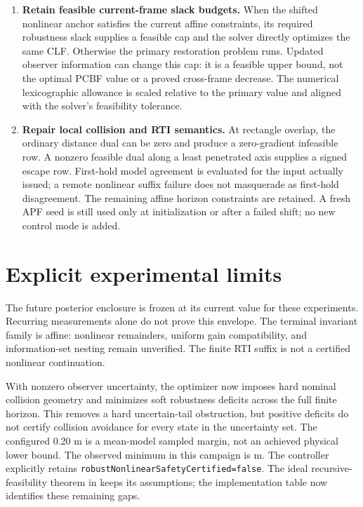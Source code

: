 \documentclass[11pt]{article}
\begin{document}
\begin{enumerate}[leftmargin=*,itemsep=3pt]
\item \textbf{Retain feasible current-frame slack budgets.}
When the shifted nonlinear anchor satisfies the current affine constraints,
its required robustness slack supplies a feasible cap and the solver
directly optimizes the same CLF. Otherwise the primary restoration problem
runs. Updated observer information can change this cap: it is a feasible
upper bound, not the optimal PCBF value or a proved cross-frame decrease.
The numerical lexicographic allowance is scaled relative to the primary
value and aligned with the solver's feasibility tolerance.

\item \textbf{Repair local collision and RTI semantics.}
At rectangle overlap, the ordinary distance dual can be zero and produce
a zero-gradient infeasible row. A nonzero feasible dual along a least
penetrated axis supplies a signed escape row. First-hold model agreement
is evaluated for the input actually issued; a remote nonlinear suffix
failure does not masquerade as first-hold disagreement. The remaining
affine horizon constraints are retained. A fresh APF seed is still used
only at initialization or after a failed shift; no new control mode is added.
\end{enumerate}

\section{Explicit experimental limits}
The future posterior enclosure is frozen at its current value for these
experiments. Recurring measurements alone do not prove this envelope.
The terminal invariant family is affine: nonlinear remainders, uniform
gain compatibility, and information-set nesting remain unverified.
The finite RTI suffix is not a certified nonlinear continuation.

With nonzero observer uncertainty, the optimizer now imposes hard nominal
collision geometry and minimizes soft robustness deficits across the full
finite horizon. This removes a hard uncertain-tail obstruction, but positive
deficits do not certify collision avoidance for every state in the uncertainty
set. The configured 0.20 m is a mean-model sampled margin, not an achieved
physical lower bound. The observed minimum in this campaign is
\minimumClearance{} m. The controller explicitly retains
\texttt{robustNonlinearSafetyCertified=false}.
The ideal recursive-feasibility theorem in
 keeps its assumptions;
the implementation table now identifies these remaining gaps.
\end{document}
